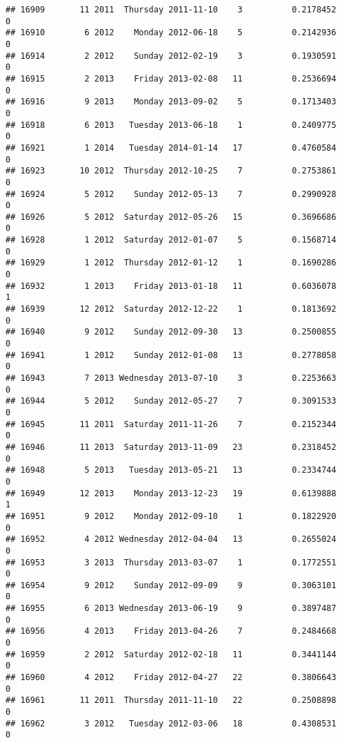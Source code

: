 \documentclass[
]{article}
\begin{document}
\begin{verbatim}
## 16909       11 2011  Thursday 2011-11-10    3          0.2178452             0
## 16910        6 2012    Monday 2012-06-18    5          0.2142936             0
## 16914        2 2012    Sunday 2012-02-19    3          0.1930591             0
## 16915        2 2013    Friday 2013-02-08   11          0.2536694             0
## 16916        9 2013    Monday 2013-09-02    5          0.1713403             0
## 16918        6 2013   Tuesday 2013-06-18    1          0.2409775             0
## 16921        1 2014   Tuesday 2014-01-14   17          0.4760584             0
## 16923       10 2012  Thursday 2012-10-25    7          0.2753861             0
## 16924        5 2012    Sunday 2012-05-13    7          0.2990928             0
## 16926        5 2012  Saturday 2012-05-26   15          0.3696686             0
## 16928        1 2012  Saturday 2012-01-07    5          0.1568714             0
## 16929        1 2012  Thursday 2012-01-12    1          0.1690286             0
## 16932        1 2013    Friday 2013-01-18   11          0.6036078             1
## 16939       12 2012  Saturday 2012-12-22    1          0.1813692             0
## 16940        9 2012    Sunday 2012-09-30   13          0.2500855             0
## 16941        1 2012    Sunday 2012-01-08   13          0.2778058             0
## 16943        7 2013 Wednesday 2013-07-10    3          0.2253663             0
## 16944        5 2012    Sunday 2012-05-27    7          0.3091533             0
## 16945       11 2011  Saturday 2011-11-26    7          0.2152344             0
## 16946       11 2013  Saturday 2013-11-09   23          0.2318452             0
## 16948        5 2013   Tuesday 2013-05-21   13          0.2334744             0
## 16949       12 2013    Monday 2013-12-23   19          0.6139888             1
## 16951        9 2012    Monday 2012-09-10    1          0.1822920             0
## 16952        4 2012 Wednesday 2012-04-04   13          0.2655024             0
## 16953        3 2013  Thursday 2013-03-07    1          0.1772551             0
## 16954        9 2012    Sunday 2012-09-09    9          0.3063101             0
## 16955        6 2013 Wednesday 2013-06-19    9          0.3897487             0
## 16956        4 2013    Friday 2013-04-26    7          0.2484668             0
## 16959        2 2012  Saturday 2012-02-18   11          0.3441144             0
## 16960        4 2012    Friday 2012-04-27   22          0.3806643             0
## 16961       11 2011  Thursday 2011-11-10   22          0.2508898             0
## 16962        3 2012   Tuesday 2012-03-06   18          0.4308531             0

\end{verbatim}
\end{document}
